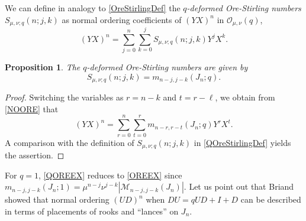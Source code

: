 \documentclass[10pt]{amsart}
\newtheorem{proposition}[theorem]{Proposition}%
\begin{document}
We can define in analogy to \eqref{OreStirlingDef} the {\em $q$-deformed Ore-Stirling numbers} $S_{\mu,\nu;q}(n;j,k) $ as normal ordering coefficients of $(YX)^n$ in ${\mathcal O}_{\mu,\nu}(q)$, 
\begin{equation}\label{QOreStirlingDef}
(YX)^n = \sum_{j=0}^{n} \sum_{k=0}^{j} S_{\mu,\nu;q}(n;j,k) Y^{j}X^{k}.
\end{equation}
\begin{proposition}\label{PropOS} The $q$-deformed Ore-Stirling numbers are given by
\begin{equation}\label{QOREEX}
S_{\mu,\nu;q}(n;j,k)=m_{n-j,j-k}(J_n;q). 
\end{equation}
\end{proposition}
\begin{proof}
Switching the variables as $r=n-k$ and $t=r-\ell$, we obtain from \eqref{NOORE} that
$$
(YX)^n = \sum_{r=0}^{n}\sum_{t=0}^{r} m_{n-r,r-t}(J_n;q) Y^{r}X^{t}.
$$
A comparison with the definition of $S_{\mu,\nu;q}(n;j,k)$ in \eqref{QOreStirlingDef} yields the assertion.
\end{proof}
For $q=1$, \eqref{QOREEX} reduces to  \eqref{OREEX} since $m_{n-j,j-k}(J_n;1)=\mu^{n-j}\nu^{j-k}|{\mathcal M}_{n-j,j-k}(J_n)|$. Let us point out that Briand \cite[Theorem 3.1]{Briand2025} showed that normal ordering $(UD)^n$ when $DU=qUD+I+D$ can be described in terms of placements of rooks and ``lances'' on $J_n$.
\end{document}
